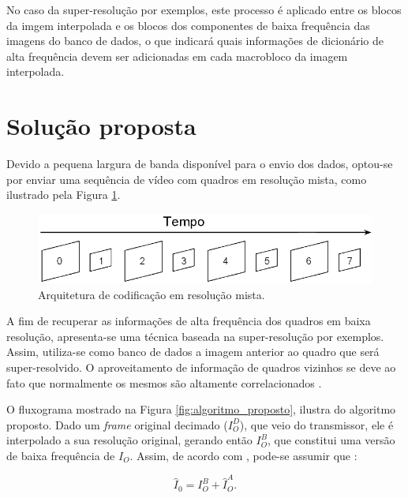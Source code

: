 No caso da super-resolução por exemplos, este processo é aplicado entre os blocos da imgem interpolada e os blocos dos componentes  de baixa frequência das imagens do banco de dados, o que indicará quais informações de dicionário de alta frequência devem ser adicionadas em cada macrobloco da imagem interpolada.

\section{Solução proposta} 
\label{algPropos}

Devido a pequena largura de banda disponível para o envio dos dados, optou-se por enviar uma sequência de vídeo com quadros em resolução mista, como ilustrado pela Figura \ref{fig:resolucao_mista}.

\begin{figure}[h]
	\centering
	\includegraphics[scale=0.45]{figuras/resolucao_mista.png}
	\caption{ Arquitetura de codificação em resolução mista.}

	\label{fig:resolucao_mista}
\end{figure}

A fim de recuperar as informações de alta frequência dos quadros em baixa resolução, apresenta-se uma técnica baseada na super-resolução por exemplos. Assim, utiliza-se como banco de dados a imagem anterior ao quadro que será super-resolvido.
    O aproveitamento de informação de quadros vizinhos se deve ao fato que normalmente  os mesmos são altamente correlacionados \cite{silva2009super}.


O fluxograma mostrado na Figura \ref{fig:algoritmo_proposto}, ilustra do algoritmo proposto. Dado um \textit{frame} original  decimado ($I_O^D$), que veio do transmissor, ele é interpolado a sua resolução original,  gerando então $I_O^B$, que constitui uma versão de baixa frequência de $I_O$.  Assim, de acordo com \cite{garcia2013tecnicas}, pode-se  assumir que  :

\begin{equation}
\widehat{I}_0 = I_O^B + \widehat{I}_O^A.
\label{eq_HF}
\end{equation}

